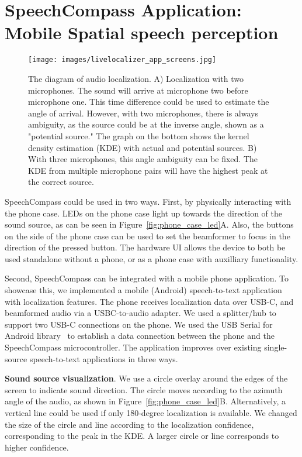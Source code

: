 \section{SpeechCompass Application: Mobile Spatial speech perception}  

\begin{figure}
  \centering
  \texttt{[image: images/livelocalizer\_app\_screens.jpg]}
  \caption{The diagram of audio localization. A) Localization with two microphones. The sound will arrive at microphone two before microphone one. This time difference could be used to estimate the angle of arrival. However, with two microphones, there is always ambiguity, as the source could be at the inverse angle, shown as a "potential source." The graph on the bottom shows the kernel density estimation (KDE) with actual and potential sources. B) With three microphones, this angle ambiguity can be fixed. The KDE from multiple microphone pairs will have the highest peak at the correct source. }
  \label{fig:tdoa_diagram}  
\end{figure}

SpeechCompass could be used in two ways.  First, by physically interacting with the phone case. LEDs on the phone case light up towards the direction of the sound source, as can be seen in Figure~\ref{fig:phone_case_led}A. Also, the buttons on the side of the phone case can be used to set the beamformer to focus in the direction of the pressed button. 
The hardware UI allows the device to both be used standalone without a phone, or as a phone case with auxilliary functionality.  


Second, SpeechCompass can be integrated with a mobile phone application. To showcase this, we implemented a mobile (Android) speech-to-text application with localization features. The phone receives localization data over USB-C, and beamformed audio via a USBC-to-audio adapter. We used a splitter/hub to support two USB-C connections on the phone. We used the USB Serial for Android library~\cite{AndroidUSBLibrary} to establish a data connection between the phone and the SpeechCompass microcontroller. The application improves over existing single-source speech-to-text applications in three ways.

\textbf{Sound source visualization}. 
We use a circle overlay around the edges of the screen to indicate sound direction. The circle moves according to the azimuth angle of the audio, as shown in Figure~\ref{fig:phone_case_led}B. Alternatively, a vertical line could be used if only 180-degree localization is available. We changed the size of the circle and line according to the localization confidence, corresponding to the peak in the KDE. A larger circle or line corresponds to higher confidence.  

